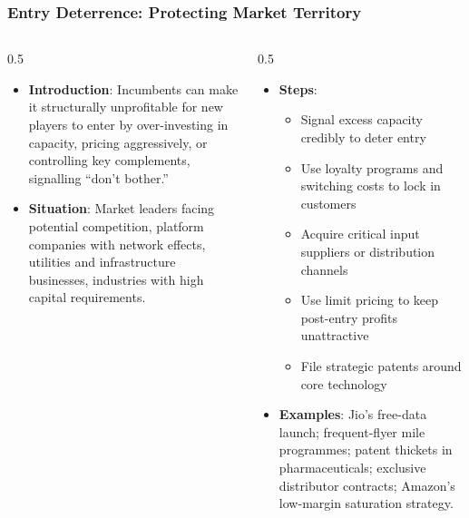 \begin{frame}[fragile]\frametitle{Entry Deterrence: Protecting Market Territory}
\begin{columns}
    \begin{column}[T]{0.5\linewidth}
      \begin{itemize}
        \item \textbf{Introduction}: Incumbents can make it structurally unprofitable for new players to enter by over-investing in capacity, pricing aggressively, or controlling key complements, signalling ``don't bother.''
        \item \textbf{Situation}: Market leaders facing potential competition, platform companies with network effects, utilities and infrastructure businesses, industries with high capital requirements.
      \end{itemize}
    \end{column}
    \begin{column}[T]{0.5\linewidth}
      \begin{itemize}
        \item \textbf{Steps}:
        \begin{itemize}
          \item Signal excess capacity credibly to deter entry
          \item Use loyalty programs and switching costs to lock in customers
          \item Acquire critical input suppliers or distribution channels
          \item Use limit pricing to keep post-entry profits unattractive
          \item File strategic patents around core technology
        \end{itemize}\item \textbf{Examples}: Jio's free-data launch; frequent-flyer mile programmes; patent thickets in pharmaceuticals; exclusive distributor contracts; Amazon's low-margin saturation strategy.
      \end{itemize}
    \end{column}
  \end{columns}
\end{frame}

